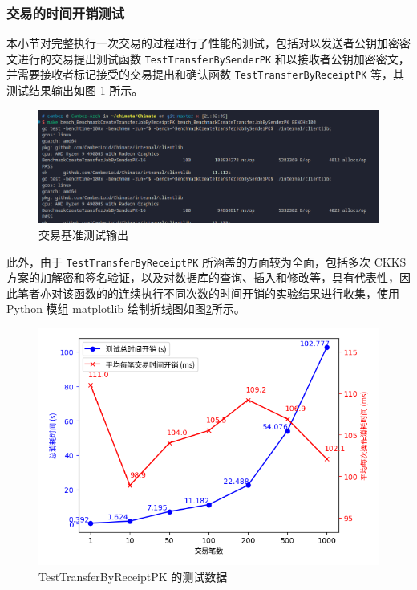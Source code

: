 \subsubsection{交易的时间开销测试}

本小节对完整执行一次交易的过程进行了性能的测试，包括对以发送者公钥加密密文进行的交易提出测试函数 \verb|TestTransferBySenderPK| 和以接收者公钥加密密文，并需要接收者标记接受的交易提出和确认函数 \verb|TestTransferByReceiptPK| 等，其测试结果输出如图 \ref{Fig:bench_transaction} 所示。

\begin{figure}
    \centering
    \includegraphics[width=0.9\linewidth]{./Figures/Bench_Transaction_all.png}
    \caption{交易基准测试输出}\label{Fig:bench_transaction}
\end{figure}

此外，由于 \verb|TestTransferByReceiptPK| 所涵盖的方面较为全面，包括多次 CKKS 方案的加解密和签名验证，以及对数据库的查询、插入和修改等，具有代表性，因此笔者亦对该函数的的连续执行不同次数的时间开销的实验结果进行收集，使用 Python 模组 matplotlib 绘制折线图如图\ref{Fig:graph_bench_transaction}所示。

\begin{figure}[h]
    \centering
    \includegraphics[width=0.9\linewidth]{./Figures/matplots/Bench_CreateTransferJobByReceiptPK.png}
    \caption{TestTransferByReceiptPK 的测试数据}\label{Fig:graph_bench_transaction}
\end{figure}

